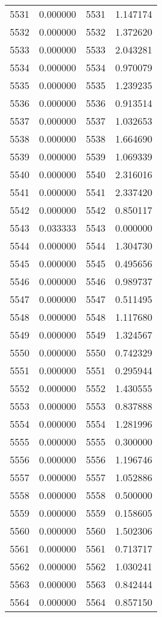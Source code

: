 \documentclass[12pt]{article}
\begin{document}
\begin{longtable}{@{}cccc@{}}
5531 & 0.000000 & 5531 & 1.147174 \\
5532 & 0.000000 & 5532 & 1.372620 \\
5533 & 0.000000 & 5533 & 2.043281 \\
5534 & 0.000000 & 5534 & 0.970079 \\
5535 & 0.000000 & 5535 & 1.239235 \\
5536 & 0.000000 & 5536 & 0.913514 \\
5537 & 0.000000 & 5537 & 1.032653 \\
5538 & 0.000000 & 5538 & 1.664690 \\
5539 & 0.000000 & 5539 & 1.069339 \\
5540 & 0.000000 & 5540 & 2.316016 \\
5541 & 0.000000 & 5541 & 2.337420 \\
5542 & 0.000000 & 5542 & 0.850117 \\
5543 & 0.033333 & 5543 & 0.000000 \\
5544 & 0.000000 & 5544 & 1.304730 \\
5545 & 0.000000 & 5545 & 0.495656 \\
5546 & 0.000000 & 5546 & 0.989737 \\
5547 & 0.000000 & 5547 & 0.511495 \\
5548 & 0.000000 & 5548 & 1.117680 \\
5549 & 0.000000 & 5549 & 1.324567 \\
5550 & 0.000000 & 5550 & 0.742329 \\
5551 & 0.000000 & 5551 & 0.295944 \\
5552 & 0.000000 & 5552 & 1.430555 \\
5553 & 0.000000 & 5553 & 0.837888 \\
5554 & 0.000000 & 5554 & 1.281996 \\
5555 & 0.000000 & 5555 & 0.300000 \\
5556 & 0.000000 & 5556 & 1.196746 \\
5557 & 0.000000 & 5557 & 1.052886 \\
5558 & 0.000000 & 5558 & 0.500000 \\
5559 & 0.000000 & 5559 & 0.158605 \\
5560 & 0.000000 & 5560 & 1.502306 \\
5561 & 0.000000 & 5561 & 0.713717 \\
5562 & 0.000000 & 5562 & 1.030241 \\
5563 & 0.000000 & 5563 & 0.842444 \\
5564 & 0.000000 & 5564 & 0.857150 \\

\end{longtable}
\end{document}
